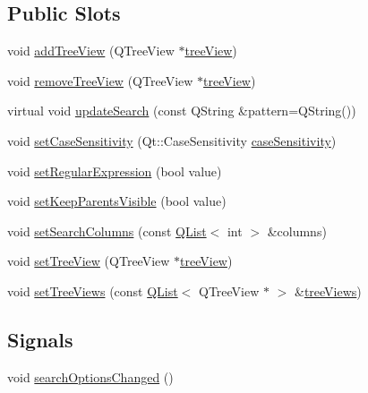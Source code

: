 \subsection*{Public Slots}
\begin{DoxyCompactItemize}
\item 
void \hyperlink{classKTreeViewSearchLine_ad3b07726c1a9a6644704896f9e40fe6d}{add\+Tree\+View} (Q\+Tree\+View $\ast$\hyperlink{classKTreeViewSearchLine_aeeec1dac59277de847c59fbad49d53b6}{tree\+View})
\item 
void \hyperlink{classKTreeViewSearchLine_a9dd82793007329e80d8bc4e10235563c}{remove\+Tree\+View} (Q\+Tree\+View $\ast$\hyperlink{classKTreeViewSearchLine_aeeec1dac59277de847c59fbad49d53b6}{tree\+View})
\item 
virtual void \hyperlink{classKTreeViewSearchLine_a8645880536c6669ab2919ddce52aedf8}{update\+Search} (const Q\+String \&pattern=Q\+String())
\item 
void \hyperlink{classKTreeViewSearchLine_a8eda8a70474ddee7918c32a0f60ce3c7}{set\+Case\+Sensitivity} (Qt\+::\+Case\+Sensitivity \hyperlink{classKTreeViewSearchLine_ac71c42af94b282cc2ec6ea34dde396e7}{case\+Sensitivity})
\item 
void \hyperlink{classKTreeViewSearchLine_ad1bd6c121df94564fea08af73c39b88b}{set\+Regular\+Expression} (bool value)
\item 
void \hyperlink{classKTreeViewSearchLine_afe2c3183ded8a131e43e972987467366}{set\+Keep\+Parents\+Visible} (bool value)
\item 
void \hyperlink{classKTreeViewSearchLine_acad44d3d3a453c6aadc10f054d950f12}{set\+Search\+Columns} (const \hyperlink{classQList}{Q\+List}$<$ int $>$ \&columns)
\item 
void \hyperlink{classKTreeViewSearchLine_ad70ac8b6652c842b370c6cb1fa6ff9d5}{set\+Tree\+View} (Q\+Tree\+View $\ast$\hyperlink{classKTreeViewSearchLine_aeeec1dac59277de847c59fbad49d53b6}{tree\+View})
\item 
void \hyperlink{classKTreeViewSearchLine_a07e5c0f6fee577a40694f861a6a34cc2}{set\+Tree\+Views} (const \hyperlink{classQList}{Q\+List}$<$ Q\+Tree\+View $\ast$ $>$ \&\hyperlink{classKTreeViewSearchLine_a0f522902ce6754fd223f7ce1814a2a94}{tree\+Views})
\end{DoxyCompactItemize}
\subsection*{Signals}
\begin{DoxyCompactItemize}
\item 
void \hyperlink{classKTreeViewSearchLine_ad280351217308b67e8cce9f961f52104}{search\+Options\+Changed} ()
\end{DoxyCompactItemize}
